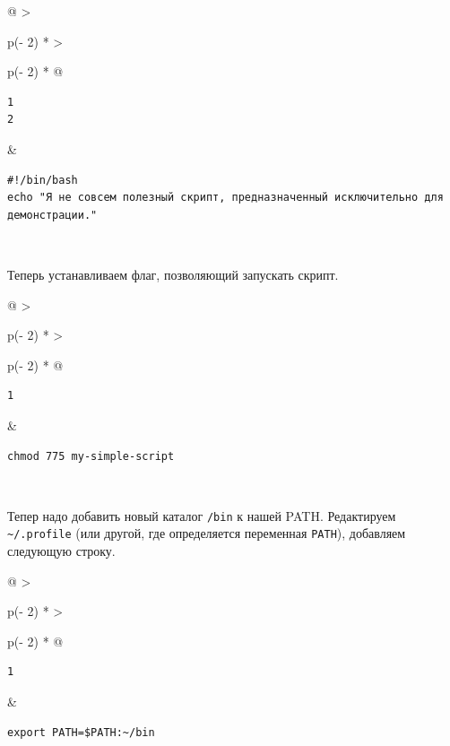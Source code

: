 \documentclass{article}
\begin{document}
\begin{longtable}[]{@{}
  >{\raggedright\arraybackslash}p{(\columnwidth - 2\tabcolsep) * }
  >{\raggedright\arraybackslash}p{(\columnwidth - 2\tabcolsep) * }@{}}
\toprule
\endhead
\begin{minipage}[t]{\linewidth}\raggedright
\begin{verbatim}
1
2
\end{verbatim}
\end{minipage} & \begin{minipage}[t]{\linewidth}\raggedright
\begin{verbatim}
#!/bin/bash
echo "Я не совсем полезный скрипт, предназначенный исключительно для демонстрации."
\end{verbatim}
\end{minipage} \\ \addlinespace
\bottomrule
\end{longtable}

Теперь устанавливаем флаг, позволяющий запускать скрипт.

\begin{longtable}[]{@{}
  >{\raggedright\arraybackslash}p{(\columnwidth - 2\tabcolsep) * }
  >{\raggedright\arraybackslash}p{(\columnwidth - 2\tabcolsep) * }@{}}
\toprule
\endhead
\begin{minipage}[t]{\linewidth}\raggedright
\begin{verbatim}
1
\end{verbatim}
\end{minipage} & \begin{minipage}[t]{\linewidth}\raggedright
\begin{verbatim}
chmod 775 my-simple-script
\end{verbatim}
\end{minipage} \\ \addlinespace
\bottomrule
\end{longtable}

Тепер надо добавить новый каталог \texttt{/bin} к нашей PATH.
Редактируем \texttt{\textasciitilde{}/.profile} (или другой, где
определяется переменная \texttt{PATH}), добавляем следующую строку.

\begin{longtable}[]{@{}
  >{\raggedright\arraybackslash}p{(\columnwidth - 2\tabcolsep) * }
  >{\raggedright\arraybackslash}p{(\columnwidth - 2\tabcolsep) * }@{}}
\toprule
\endhead
\begin{minipage}[t]{\linewidth}\raggedright
\begin{verbatim}
1
\end{verbatim}
\end{minipage} & \begin{minipage}[t]{\linewidth}\raggedright
\begin{verbatim}
export PATH=$PATH:~/bin
\end{verbatim}
\end{minipage} \\ \addlinespace
\bottomrule
\end{longtable}
\end{document}
